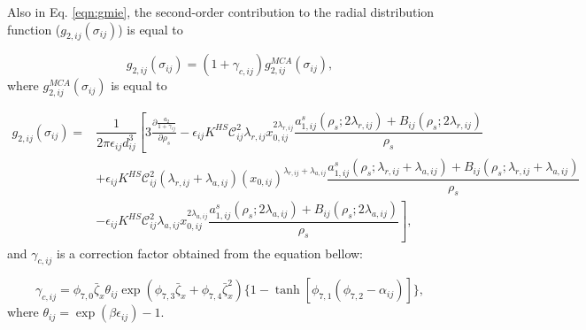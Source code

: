 Also in Eq. \ref{eqn:gmie}, the second-order contribution to the radial distribution function ($g_{2,ij}(\sigma_{ij})$) is equal to

\begin{equation}
g_{2,ij}(\sigma_{ij}) = (1 + \gamma_{c,ij}) g_{2,ij}^{MCA}(\sigma_{ij}), 
\end{equation}
where $g_{2,ij}^{MCA}(\sigma_{ij})$ is equal to

\begin{equation}
\begin{aligned}
g_{2,ij}(\sigma_{ij}) {}=& \dfrac{1}{2 \pi \epsilon_{ij} d _{ij}^{3}} \left[3 \frac{\partial \frac{a_{2}}{1+\gamma_{ij}}}{\partial \rho _{s}} - \epsilon_{ij} K^{HS} \mathcal{C}_{ij}^{2} \lambda_{r,ij} x_{0,ij}^{2\lambda_{r,ij}} \dfrac{a_{1,ij}^{s}(\rho_{s};2\lambda_{r,ij})+B_{ij}(\rho_{s};2\lambda_{r,ij})}{\rho _{s}} \right. \\
& \left. + \epsilon_{ij} K^{HS} \mathcal{C}_{ij}^{2} (\lambda_{r,ij}+\lambda_{a,ij}) (x_{0,ij})^{\lambda_{r,ij}+\lambda_{a,ij}} \dfrac{a_{1,ij}^{s}(\rho_{s};\lambda_{r,ij}+\lambda_{a,ij})+B_{ij}(\rho_{s};\lambda_{r,ij}+\lambda_{a,ij})}{\rho _{s}} \right. \\
& \left. - \epsilon_{ij} K^{HS} \mathcal{C}_{ij}^{2} \lambda_{a,ij} x_{0,ij}^{2\lambda_{a,ij}} \dfrac{a_{1,ij}^{s}(\rho_{s};2\lambda_{a,ij})+B_{ij}(\rho_{s};2\lambda_{a,ij})}{\rho _{s}}\right],
\end{aligned}
\label{eq:g2saft}
\end{equation} 
and $\gamma_{c,ij}$ is a correction factor obtained from the equation bellow:

\begin{equation}
\gamma_{c,ij} = \phi_{7,0} \bar{\zeta}_{x} \theta_{ij} \exp(\phi_{7,3} \bar{\zeta}_{x} + \phi_{7,4} \bar{\zeta}_{x}^2) \lbrace 1-\tanh [\phi_{7,1}(\phi_{7,2} - \alpha _{ij})] \rbrace,
\end{equation}
where $\theta _{ij} = \exp (\beta \epsilon_{ij}) -1$.
